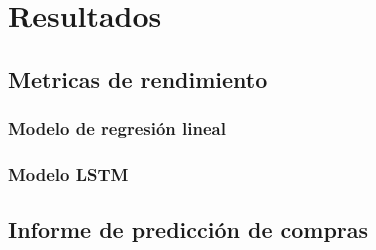 \fancyhead{}
\fancyfoot{}
\cfoot{\thepage}


\chapter{Resultados}

\section{Metricas de rendimiento}
\subsection{Modelo de regresión lineal}
\subsection{Modelo LSTM}

\section{Informe de predicción de compras}




